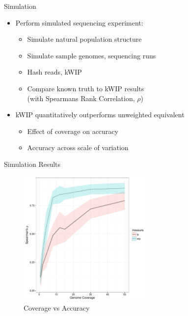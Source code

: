 \documentclass[t]{beamer}
\begin{document}
\begin{frame}{Simulation}
  \begin{itemize}
    \item Perform simulated sequencing experiment:
    \begin{itemize}
      \item Simulate natural population structure
      \item Simulate sample genomes, sequencing runs
      \item Hash reads, kWIP
      \item Compare known truth to kWIP results \\ \tiny{(with Spearmans Rank
        Correlation, $\rho$)}
    \end{itemize}
    \item kWIP quantitatively outperforms unweighted equivalent
      \begin{itemize}
        \item Effect of coverage on accuracy
        \item Accuracy across scale of variation
      \end{itemize}
  \end{itemize}
\end{frame}

\begin{frame}{Simulation Results}
  \begin{figure}
    \centering
    \includegraphics[width=0.6\textwidth]{img/cov_vs_rho_1000.pdf}
    \caption{Coverage vs Accuracy}
  \end{figure}
\end{frame}
\end{document}
